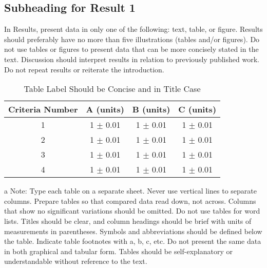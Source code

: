\documentclass{strrespaper-journ}
\begin{document}
		\subsection{Subheading for Result 1}
			In Results, present data in only one of the following: text, table, or figure.
			Results should preferably have no more than five illustrations (tables and/or figures).
			Do not use tables or figures to present data that can be more concisely stated in the text.
			Discussion should interpret results in relation to previously published work.
			Do not repeat results or reiterate the introduction.
			\begin{table}[htbp]
				\center
				\begin{threeparttable}
					\caption{Table Label Should be Concise and in Title Case }
					\label{tab:concise_table}
					\begin{tabular}{cccc}
						\toprule
						Criteria Number & A (units)       & B (units)       & C (units)       \\
						\midrule
						1               & 1 \(\pm \) 0.01 & 1 \(\pm \) 0.01 & 1 \(\pm \) 0.01 \\
						2               & 1 \(\pm \) 0.01 & 1 \(\pm \) 0.01 & 1 \(\pm \) 0.01 \\
						3               & 1 \(\pm \) 0.01 & 1 \(\pm \) 0.01 & 1 \(\pm \) 0.01 \\
						4               & 1 \(\pm \) 0.01 & 1 \(\pm \) 0.01 & 1 \(\pm \) 0.01 \\
						\bottomrule
					\end{tabular}
					\begin{tablenotes}
						\small
						\item[a] Note: Type each table on a separate sheet.
						Never use vertical lines to separate columns.
						Prepare tables so that compared data read down, not across.
						Columns that show no significant variations should be omitted.
						Do not use tables for word lists.
						Titles should be clear, and column headings should be brief with units of measurements in parentheses.
						Symbols and abbreviations should be defined below the table.
						Indicate table footnotes with a, b, c, etc.
						Do not present the same data in both graphical and tabular form.
						Tables should be self-explanatory or understandable without reference to the text.
					\end{tablenotes}
				\end{threeparttable}
			\end{table}
\end{document}
